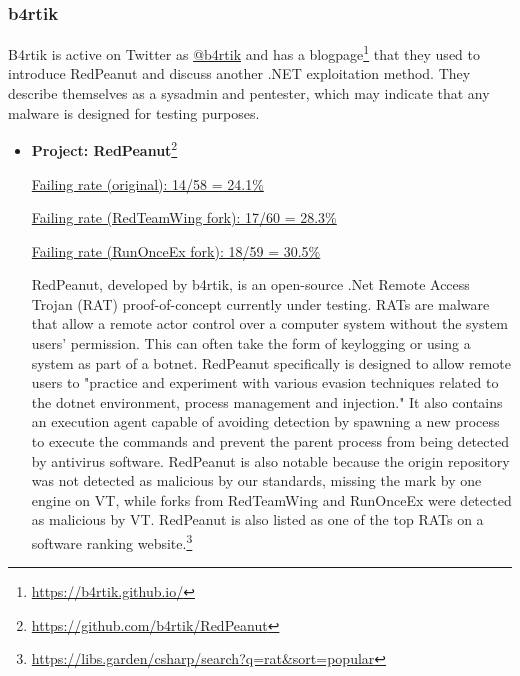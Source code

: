 \documentclass[]{acmart}
\begin{document}
\subsubsection{b4rtik}
B4rtik is active on Twitter as \href{https://twitter.com/b4rtik}{@b4rtik} and has a blogpage\footnote{\url{https://b4rtik.github.io/}} that they used to introduce RedPeanut and discuss another .NET exploitation method. They describe themselves as a sysadmin and pentester, which may indicate that any malware is designed for testing purposes.
\begin{itemize}
    \item { \bf Project: RedPeanut}\footnote{\url{https://github.com/b4rtik/RedPeanut}}
    
    \underline{ Failing rate (original): 14/58 = 24.1\% }
    
    \underline{ Failing rate (RedTeamWing fork): 17/60 = 28.3\% }
    
    \underline{ Failing rate (RunOnceEx fork): 18/59 = 30.5\% }
    
    RedPeanut, developed by b4rtik, is an open-source .Net Remote Access Trojan (RAT) proof-of-concept currently under testing. RATs are malware that allow a remote actor control over a computer system without the system users' permission. This can often take the form of keylogging or using a system as part of a botnet. RedPeanut specifically is designed to allow remote users to "practice and experiment with various evasion techniques related to the dotnet environment, process management and injection." It also contains an execution agent capable of avoiding detection by spawning a new process to execute the commands and prevent the parent process from being detected by antivirus software. RedPeanut is also notable because the origin repository was not detected as malicious by our standards, missing the mark by one engine on VT, while forks from RedTeamWing and RunOnceEx were detected as malicious by VT. RedPeanut is also listed as one of the top RATs on a software ranking website.\footnote{\url{https://libs.garden/csharp/search?q=rat&sort=popular}}
    \end{itemize}
\end{document}
